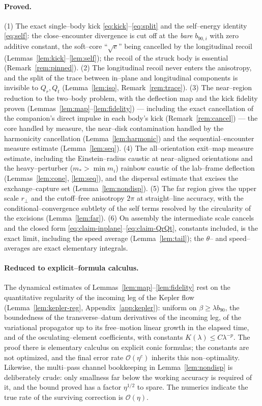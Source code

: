 \documentclass[11pt]{article}
\newcommand{\rp}{r_\perp}
\newcommand{\order}[1]{\mathcal O\!\left(#1\right)}
\begin{document}
\paragraph{Proved.}
(1) The exact single--body kick \eqref{eq:kick}--\eqref{eq:split} and the self--energy identity
\eqref{eq:self}: the close--encounter divergence is cut off at the \emph{bare} $b_{90,i}$ with zero
additive constant, the soft--core ``$\sqrt e$'' being cancelled by the longitudinal recoil
(Lemmas~\ref{lem:kick}--\ref{lem:self}); the recoil of the struck body is essential
(Remark~\ref{rem:pinned}). (2) The longitudinal recoil never enters the anisotropy, and the split of the trace between
in--plane and longitudinal components is invisible to $Q_r,Q_t$
(Lemma~\ref{lem:iso}, Remark~\ref{rem:trace}). (3) The near--region reduction to the two--body
problem, with the deflection
map and the kick fidelity proven (Lemmas~\ref{lem:map}--\ref{lem:fidelity}) --- including the exact
cancellation of the companion's direct impulse in each body's kick (Remark~\ref{rem:cancel}) ---
the core handled by
measure, the near--disk contamination handled by the harmonicity cancellation
(Lemma~\ref{lem:harmonic}) and the sequential--encounter measure estimate (Lemma~\ref{lem:seq}).
(4) The all--orientation exit--map measure estimate, including the Einstein--radius caustic at
near--aligned orientations and the heavy--perturber ($m_*>\min m_i$) rainbow caustic of the
lab--frame deflection (Lemmas~\ref{lem:cone}, \ref{lem:seq}), and the dispersal estimate that
excises the exchange--capture set (Lemma~\ref{lem:nondisp}).
(5) The far region gives the upper scale $\rp$ and the cutoff--free anisotropy $2\pi$ at
straight--line accuracy, with the conditional--convergence subtlety of the self terms resolved by
the circularity of the excisions (Lemma~\ref{lem:far}). (6) On assembly the intermediate scale
cancels and the closed form \eqref{eq:claim-inplane}--\eqref{eq:claim-QrQt}, constants included, is
the exact limit, including the speed average (Lemma~\ref{lem:tail}); the $\theta$-- and
speed--averages are exact elementary integrals.

\paragraph{Reduced to explicit--formula calculus.}
The dynamical estimates of Lemmas~\ref{lem:map}--\ref{lem:fidelity} rest on the quantitative
regularity of the incoming leg of the Kepler flow (Lemma~\ref{lem:kepler-reg},
Appendix~\ref{app:kepler}): uniform on $\beta\ge\lambda b_{90}$, the boundedness of the
transverse--datum derivatives of the incoming leg, of the variational propagator up to its
free--motion linear growth in the elapsed time, and of the osculating--element coefficients, with
constants $K(\lambda)\le C\lambda^{-p}$. The proof there is elementary calculus on explicit conic formulas;
the constants are not optimized, and the final error rate
$\order{\eta^{c}}$ inherits this non--optimality. Likewise, the multi--pass channel bookkeeping in
Lemma~\ref{lem:nondisp} is deliberately crude: only smallness far below the working accuracy is
required of it, and the bound proved has a factor $\eta^{1/2}$ to spare. The numerics indicate the
true rate of the surviving correction is $\order\eta$.
\end{document}
